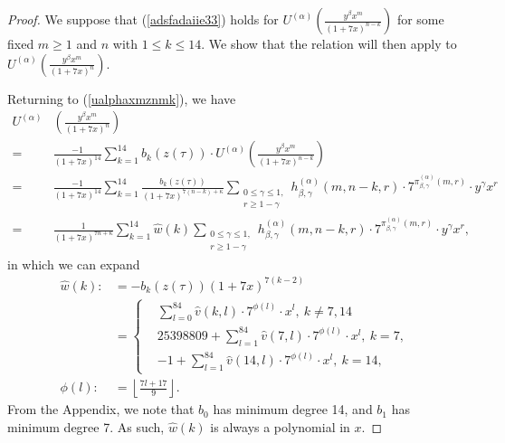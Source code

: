 \documentclass[reqno]{amsart}
\theoremstyle{definition}
\theoremstyle{remark}
\numberwithin{equation}{section}
\begin{document}
\begin{proof}

We suppose that (\ref{adsfadaiie33}) holds for $U^{(\alpha)}\left( \frac{y^{\beta}x^{m}}{(1+7x)^{n-k}} \right)$ for some fixed $m\ge 1$ and $n$ with $1\le k\le 14$.  We show that the relation will then apply to $U^{(\alpha)}\left( \frac{y^{\beta}x^{m}}{(1+7x)^{n}} \right)$.

Returning to (\ref{ualphaxmznmk}), we have
\begin{align*}
U^{(\alpha)}&\left( \frac{y^{\beta}x^{m}}{(1+7x)^{n}} \right)\nonumber\\ =& \frac{-1}{(1+7x)^{14}}\sum_{k=1}^{14}b_k(z(\tau))\cdot U^{(\alpha)}\left( \frac{y^{\beta}x^{m}}{(1+7x)^{n-k}} \right)\\
=& \frac{-1}{(1+7x)^{14}}\sum_{k=1}^{14} \frac{b_k(z(\tau))}{(1+7x)^{7(n-k)+\kappa}} \sum_{\substack{0\le\gamma\le 1,\\ r\ge 1-\gamma}} h^{(\alpha)}_{\beta,\gamma}(m,n-k,r)\cdot 7^{\pi^{(\alpha)}_{\beta,\gamma}(m,r)}\cdot y^{\gamma}x^r\\
=&\frac{1}{(1+7x)^{7n+\kappa}}\sum_{k=1}^{14} \hat{w}(k)\sum_{\substack{0\le\gamma\le 1,\\ r\ge 1-\gamma}} h^{(\alpha)}_{\beta,\gamma}(m,n-k,r)\cdot 7^{\pi^{(\alpha)}_{\beta,\gamma}(m,r)}\cdot y^{\gamma}x^r,
\end{align*} in which we can expand
\begin{align*}
\hat{w}(k) :&= -b_k(z(\tau))(1+7x)^{7(k-2)}\\
&=\begin{cases}
& \displaystyle{\sum_{l=0}^{84} \hat{v}(k,l)\cdot 7^{\phi(l)}\cdot x^l},\ k\neq 7,14\\
&\displaystyle{25398809+\sum_{l=1}^{84} \hat{v}(7,l)\cdot 7^{\phi(l)}\cdot x^l},\ k=7,\\
&\displaystyle{-1+\sum_{l=1}^{84} \hat{v}(14,l)\cdot 7^{\phi(l)}\cdot x^l},\ k=14,
\end{cases}\\
\phi(l) :&= \left\lfloor \frac{7l+17}{9} \right\rfloor.
\end{align*}  From the Appendix, we note that $b_0$ has minimum degree 14, and $b_1$ has minimum degree 7.  As such, $\hat{w}(k)$ is always a polynomial in $x$.


\end{proof}
\end{document}
